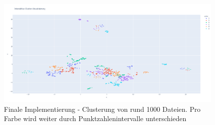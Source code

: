 \begin{figure} %
	\centering
	\includegraphics[width=1.0\textwidth]{images/Clusterung - 1000.pdf}
	\caption{Finale Implementierung - Clusterung von rund 1000 Dateien. Pro Farbe wird weiter durch Punktzahlenintervalle unterschieden}
	\label{abb:C-1000}
\end{figure}

